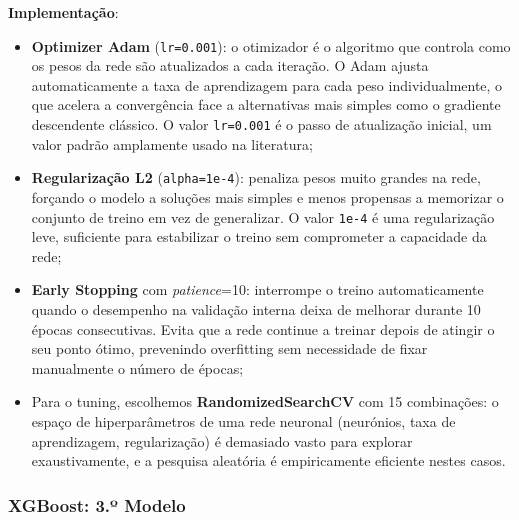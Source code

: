 \documentclass[12pt,a4paper]{article}
\begin{document}
\textbf{Implementação}:
\begin{itemize}
  \item \textbf{Optimizer Adam} (\texttt{lr=0.001}): o otimizador é o algoritmo que
    controla como os pesos da rede são atualizados a cada iteração. O Adam ajusta
    automaticamente a taxa de aprendizagem para cada peso individualmente, o que acelera
    a convergência face a alternativas mais simples como o gradiente descendente clássico.
    O valor \texttt{lr=0.001} é o passo de atualização inicial, um valor padrão
    amplamente usado na literatura;
  \item \textbf{Regularização L2} (\texttt{alpha=1e-4}): penaliza pesos muito grandes
    na rede, forçando o modelo a soluções mais simples e menos propensas a memorizar o
    conjunto de treino em vez de generalizar. O valor \texttt{1e-4} é uma regularização
    leve, suficiente para estabilizar o treino sem comprometer a capacidade da rede;
  \item \textbf{Early Stopping} com \textit{patience}=10: interrompe o treino
    automaticamente quando o desempenho na validação interna deixa de melhorar durante
    10 épocas consecutivas. Evita que a rede continue a treinar depois de atingir o seu
    ponto ótimo, prevenindo overfitting sem necessidade de fixar manualmente o número
    de épocas;
  \item Para o tuning, escolhemos \textbf{RandomizedSearchCV} com 15 combinações:
    o espaço de hiperparâmetros de uma rede neuronal (neurónios, taxa de aprendizagem,
    regularização) é demasiado vasto para explorar exaustivamente, e a pesquisa aleatória
    é empiricamente eficiente nestes casos.
\end{itemize}

\subsubsection{XGBoost: 3.º Modelo}
\end{document}
